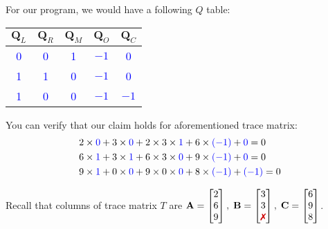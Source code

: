 \documentclass[../lecture-notes.tex]{subfiles}
\begin{document}
\begin{example}

For our program, we would have a following $Q$ table:
\begin{center}
\begin{tabular}{|c|c|c|c|c|}
\hline
\rowcolor{gray!30}$\mathbf{Q}_L$ & $\mathbf{Q}_R$ & $\mathbf{Q}_M$ & $\mathbf{Q}_O$ & $\mathbf{Q}_C$ \\ 
\hline
\textcolor{blue}{0} & \textcolor{blue}{0} & \textcolor{blue}{1} & \textcolor{blue}{$-1$} & \textcolor{blue}{0} \\ 
\hline
\textcolor{blue}{1} & \textcolor{blue}{1} & \textcolor{blue}{0} & \textcolor{blue}{$-1$} & \textcolor{blue}{0} \\ 
\hline
\textcolor{blue}{1} & \textcolor{blue}{0} & \textcolor{blue}{0} & \textcolor{blue}{$-1$} & \textcolor{blue}{$-1$} \\ 
\hline
\end{tabular}
\end{center}

You can verify that our claim holds for aforementioned trace matrix:
\begin{align*}
  &2 \times \textcolor{blue}{0} + 3 \times \textcolor{blue}{0} + 2 \times 3 \times \textcolor{blue}{1} + 6 \times \textcolor{blue}{(-1)} + \textcolor{blue}{0} = 0 \\
  &6 \times \textcolor{blue}{1} + 3 \times \textcolor{blue}{1} + 6 \times 3 \times \textcolor{blue}{0} + 9 \times \textcolor{blue}{(-1)} + \textcolor{blue}{0} = 0 \\
  &9 \times \textcolor{blue}{1} + 0 \times \textcolor{blue}{0} + 9 \times 0 \times \textcolor{blue}{0} + 8 \times \textcolor{blue}{(-1)} + \textcolor{blue}{(-1)} = 0 
\end{align*}

Recall that columns of trace matrix $T$ are $\mathbf{A} = \begin{bmatrix} 2 \\ 6 \\ 9 \end{bmatrix}, \;\mathbf{B} = \begin{bmatrix} 3 \\ 3 \\ \text{\xmark} \end{bmatrix}, \;\mathbf{C} = \begin{bmatrix} 6 \\ 9 \\ 8 \end{bmatrix}$.

\end{example}
\end{document}
